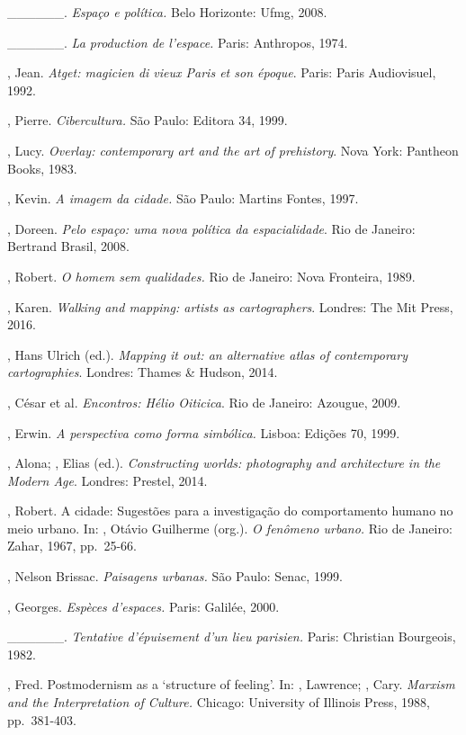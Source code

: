 \begin{Parskip}
\_\_\_\_\_\_. \emph{Espaço e política.} Belo Horizonte: Ufmg, 2008.

\_\_\_\_\_\_. \emph{La production de l'espace.} Paris: Anthropos, 1974.

, Jean. \emph{Atget: magicien di vieux Paris et son époque}.
Paris: Paris Audiovisuel, 1992.

, Pierre. \emph{Cibercultura.} São Paulo: Editora 34, 1999.

, Lucy. \emph{Overlay: contemporary art and the art of
prehistory}. Nova York: Pantheon Books, 1983.

, Kevin. \emph{A imagem da cidade.} São Paulo: Martins Fontes,
1997.

, Doreen. \emph{Pelo espaço: uma nova política da
espacialidade}. Rio de Janeiro: Bertrand Brasil, 2008.

, Robert. \emph{O homem sem qualidades.} Rio de Janeiro: Nova
Fronteira, 1989.

, Karen. \emph{Walking and mapping: artists as cartographers}.
Londres: The Mit Press, 2016. %

, Hans Ulrich (ed.). \emph{Mapping it out: an alternative atlas
of contemporary cartographies}. Londres: Thames \& Hudson, 2014.

, César et al. \emph{Encontros: Hélio Oiticica}. Rio de
Janeiro: Azougue, 2009.

, Erwin. \emph{A perspectiva como forma simbólica.} Lisboa:
Edições 70, 1999.

, Alona; , Elias (ed.). \emph{Constructing worlds:
photography and architecture in the Modern Age}. Londres: Prestel, 2014.

, Robert. A cidade: Sugestões para a investigação do comportamento
humano no meio urbano. In: , Otávio Guilherme (org.). \emph{O
fenômeno urbano.} Rio de Janeiro: Zahar, 1967, pp.~25-66.

, Nelson Brissac. \emph{Paisagens urbanas.} São Paulo: Senac, 1999.

, Georges. \emph{Espèces d'espaces.} Paris: Galilée, 2000.

\_\_\_\_\_\_. \emph{Tentative d'épuisement d'un lieu parisien.}
Paris: Christian Bourgeois, 1982.

, Fred. Postmodernism as a `structure of feeling'. In: ,
Lawrence; , Cary. \emph{Marxism and the Interpretation of
Culture.} Chicago: University of Illinois Press, 1988, pp.~381-403.


\end{Parskip}

